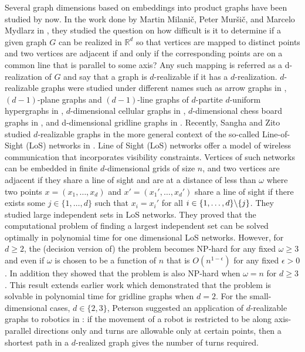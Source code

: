 \documentclass[12pt,a4paper,titlepage,openany]{report}
\begin{document}
Several graph dimensions based on embeddings into product graphs have been studied by now. In the work done by Martin Milani\v c, Peter Mur\v si\v c, and Marcelo Mydlarz in \cite{Milanic}, they studied the question on how difficult is it to determine if a given graph $G$ can be realized in $\mathbb{R}^d$ so that vertices are mapped to distinct points and two vertices are adjacent if and only if the corresponding points are on a common line that is parallel to some axis?
Any such mapping is referred as a d-realization of $G$ and say that a graph is $d$-realizable if it has a $d$-realization. $d$-realizable graphs were studied under different names such as arrow graphs in \cite{Cook}, $(d - 1)$-plane graphs and $(d -1)$-line graphs of $d$-partite $d$-uniform hypergraphs in \cite{Bermond}, $d$-dimensional cellular graphs in \cite{Gurvich}, $d$-dimensional chess board graphs in \cite{Staton}, and d-dimensional gridline graphs in \cite{Peterson}.
Recently, Sangha and Zito studied $d$-realizable graphs in the more general context of the so-called Line-of-Sight (LoS) networks in \cite{Zito}. Line of Sight (LoS) networks offer a model of wireless communication that incorporates visibility constraints. Vertices of such networks can be embedded in finite $d$-dimensional grids of size $n$, and two vertices are adjacent if they share a line of sight and are at a distance of less than $\omega$ where two points $x=(x_1, \ldots,x_d)$ and $x'=(x_1',\ldots ,x_d')$ share a line of sight if there exists some $j\in \{1,\ldots,d\}$ such that $x_i=x_i'$ for all $i\in \{1,\ldots,d\} \symbol{92} \{j\}$. They studied large independent sets in LoS networks. They proved that the computational problem of finding a largest independent set can be solved optimally in polynomial time for one dimensional LoS networks. However, for $d \geq 2$, the (decision version of) the problem becomes NP-hard for any fixed $\omega \geq 3$ and even if $ω$ is chosen to be a function of $n$ that is $O(n^{1-\epsilon})$ for any fixed $\epsilon>0$. In addition they showed that the problem is also NP-hard when $\omega = n$ for $d \geq 3$. This result extends earlier work which demonstrated that the problem is solvable in polynomial time for gridline graphs when $d = 2$. For the small-dimensional cases, $d \in \{2, 3\}$, Peterson suggested an application of $d$-realizable graphs to robotics in \cite{Peterson}: if the movement of a robot is restricted to be along axis-parallel directions only and turns are allowable only at certain points, then a shortest path in a $d$-realized graph gives the number of turns required.\newline
\end{document}
